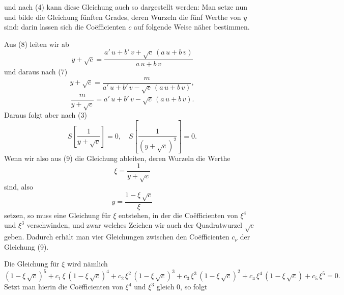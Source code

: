 und nach (4) kann diese Gleichung auch so dargestellt werden:
Man setze nun
und bilde die Gleichung f\"unften Grades, deren Wurzeln die f\"unf Werthe von $y$ sind:
darin lassen sich die Co\"efficienten $c$ auf folgende Weise n\"aher bestimmen.

Aus (8) leiten wir ab
\[
y + \sqrt{c} = \frac{a'\,u + b'\,v + \sqrt{c}\,(a\,u + b\,v)}{a\,u + b\,v}
\]
und daraus nach (7)
\[
y + \sqrt{c} = \frac{m}{a'\,u + b'\,v - \sqrt{c}\,(a\,u + b\,v)},
\]
\[
\frac{m}{y + \sqrt{c}} = a'\,u + b'\,v - \sqrt{c}\,(a\,u + b\,v).
\]
Daraus folgt aber nach (3)
\[
S\left[\frac{1}{y + \sqrt{c}}\right] = 0, \quad S\left[\frac{1}{(y + \sqrt{c})^2}\right] = 0.
\]
Wenn wir also aus (9) die Gleichung ableiten, deren Wurzeln die Werthe
\[
\xi = \frac{1}{y + \sqrt{c}}
\]
sind, also
\[
y = \frac{1 - \xi\,\sqrt{c}}{\xi}
\]
setzen, so muss eine Gleichung f\"ur $\xi$ entstehen, in der die Co\"efficienten von $\xi^4$ und $\xi^3$ verschwinden, und zwar welches Zeichen wir auch der Quadratwurzel $\sqrt{c}$ geben. Dadurch erh\"alt man vier Gleichungen zwischen den Co\"efficienten $c_\nu$ der Gleichung (9).

Die Gleichung f\"ur $\xi$ wird n\"amlich
\[
(1 - \xi\,\sqrt{c})^5 + c_1\,\xi\,(1 - \xi\,\sqrt{c})^4 + c_2\,\xi^2\,(1 - \xi\,\sqrt{c})^3 + c_3\,\xi^3\,(1 - \xi\,\sqrt{c})^2 + c_4\,\xi^4\,(1 - \xi\,\sqrt{c}) + c_5\,\xi^5 = 0.
\]
Setzt man hierin die Co\"efficienten von $\xi^4$ und $\xi^3$ gleich 0, so folgt
